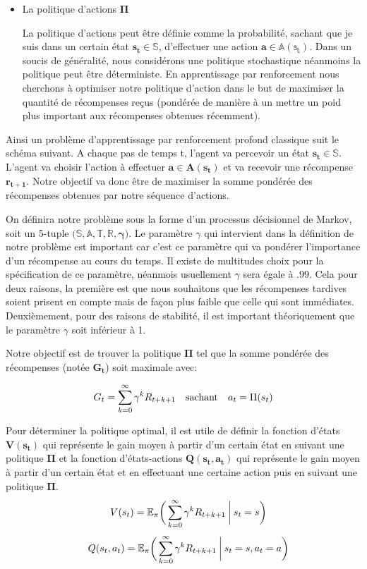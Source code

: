 \begin{itemize}
    \item La politique d'actions $\bm{\Pi}$
    
        La politique d'actions peut être définie  comme la probabilité, sachant que je suis dans un certain état $\bm{s_t \in \mathbb{S}}$, d'effectuer une action $\bm{a \in \mathbb{A(s_t)}}$.
        Dans un soucis de généralité, nous considérons une politique stochastique néanmoins la politique peut être déterministe. En apprentissage par renforcement nous cherchons à optimiser notre politique d'action dans le but de maximiser la quantité de récompenses reçus (pondérée de manière à un mettre un poid plus important aux récompenses obtenues récemment).
        

\end{itemize}

Ainsi un problème d'apprentissage par renforcement profond classique suit le schéma suivant. A chaque pas de temps t, l'agent va percevoir un état $\bm{s_t \in \mathbb{S}}$. L'agent va choisir l'action à effectuer $\bm{a \in A(s_t)}$ et va recevoir une récompense $\bm{r_{t+1}}$. Notre objectif va donc être de maximiser la somme pondérée des récompenses obtenues par notre séquence d'actions. 


On définira notre problème sous la forme d'un processus décisionnel de Markov, soit un 5-tuple $\bm{\big(\mathbb{S}, \mathbb{A}, \mathbb{T}, \mathbb{R}, \gamma \big)}$. Le paramètre $\gamma$ qui intervient dans la définition de notre problème est important car c'est ce paramètre qui va pondérer l'importance d'un récompense au cours du temps. Il existe de multitudes choix pour la spécification de ce paramètre, néanmois usuellement $\gamma$ sera égale à .99. Cela pour deux raisons, la première est que nous souhaitons que les récompenses tardives soient prisent en compte mais de façon plus faible que celle qui sont immédiates. Deuxièmement, pour des raisons de stabilité, il est important théoriquement que le paramètre $\gamma$ soit inférieur à 1.


Notre objectif est de trouver la politique $\bm{\Pi}$ tel que la somme pondérée des récompenses (notée $\bm{G_t}$) soit maximale avec:

\begin{align}
G_t = \sum_{k=0}^{\infty} \gamma^kR_{t+k+1} \quad \text{sachant} \quad a_t = \Pi(s_t)
\end{align}

Pour déterminer la politique optimal, il est utile de définir la fonction d'états $\bm{V(s_t)}$ qui représente le gain moyen à partir d'un certain état en suivant une  politique $\bm{\Pi}$ et la fonction d'états-actions $\bm{Q(s_t, a_t)}$ qui représente le gain moyen à partir d'un certain état et en effectuant une certaine action puis en suivant une  politique $\bm{\Pi}$.
\begin{gather}
\quad V(s_t) = \mathbb{E_\pi}\bigg(\sum_{k=0}^{\infty} \gamma^kR_{t+k+1} \:\bigg\vert\: s_t=s \bigg) \\[.1cm]
\quad  Q(s_t,a_t) = \mathbb{E_\pi}\bigg(\sum_{k=0}^{\infty} \gamma^kR_{t+k+1} \:\bigg\vert\: s_t=s, a_t=a \bigg)
\end{gather}



